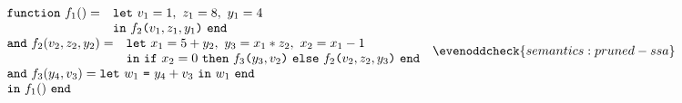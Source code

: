 \begin{equation}
\label{FunctionalConstructionProgram2}
\begin{array}{l}
  \begin{array}{ll}
    \texttt{function}\ f_1() = 
    & \texttt{let}\ {v_1} = 1,\
                    {z_1} = 8,\
                    {y_1} = 4\\
    & \texttt{in}\ {\call {f_2} {v_1,z_1,y_1}}\ \texttt{end}
  \end{array}\\
  \begin{array}{ll}
    \texttt{and}\ f_2(v_2,z_2,y_2) =
    & \texttt{let}\ {x_1} = {5+y_2},\
                    {y_3} = {x_1*z_2},\
                    {x_2} = {x_1-1}\\
    & \texttt{in}\ {\ite {x_2=0} {\call {f_3} {y_3,v_2}} 
                                 {\call {f_2} {v_2,z_2,y_3}}}\
      \texttt{end}
  \end{array}\\
  \begin{array}{l}
    \texttt{and}\ f_3(y_4,v_3) = \letin {w_1} {y_4+v_3} {w_1}\\
    \texttt{in}\ f_1()\ \texttt{end}
  \end{array} 
\end{array}
  \evenoddcheck{semantics:pruned-ssa}
\end{equation}
